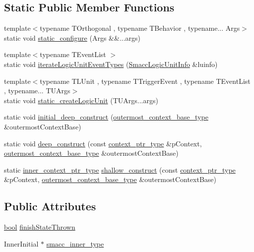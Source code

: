 \subsection*{Static Public Member Functions}
\begin{DoxyCompactItemize}
\item 
{\footnotesize template$<$typename T\+Orthogonal , typename T\+Behavior , typename... Args$>$ }\\static void \hyperlink{classsmacc_1_1SmaccState_a3e335f3290e4968db0c8e22bf88356b7}{static\+\_\+configure} (Args \&\&...args)
\item 
{\footnotesize template$<$typename T\+Event\+List $>$ }\\static void \hyperlink{classsmacc_1_1SmaccState_a234cb467d9054c636f9ee77f1174b253}{iterate\+Logic\+Unit\+Event\+Types} (\hyperlink{structsmacc_1_1SmaccLogicUnitInfo}{Smacc\+Logic\+Unit\+Info} \&luinfo)
\item 
{\footnotesize template$<$typename T\+L\+Unit , typename T\+Trigger\+Event , typename T\+Event\+List , typename... T\+U\+Args$>$ }\\static void \hyperlink{classsmacc_1_1SmaccState_a6fc90cf59c60c749e82f49aafb079b23}{static\+\_\+create\+Logic\+Unit} (T\+U\+Args...\+args)
\item 
static void \hyperlink{classsmacc_1_1SmaccState_af4b4635d16a32bdd3956e5d40ddbd01d}{initial\+\_\+deep\+\_\+construct} (\hyperlink{classsmacc_1_1SmaccState_aaf76bbe2aa9dd73e3284605f84ab4b16}{outermost\+\_\+context\+\_\+base\+\_\+type} \&outermost\+Context\+Base)
\item 
static void \hyperlink{classsmacc_1_1SmaccState_aac23d8a6909f75c5e5fca2a7c09b5368}{deep\+\_\+construct} (const \hyperlink{classsmacc_1_1SmaccState_a0e15b77514301039f6bc093a9d3f6425}{context\+\_\+ptr\+\_\+type} \&p\+Context, \hyperlink{classsmacc_1_1SmaccState_aaf76bbe2aa9dd73e3284605f84ab4b16}{outermost\+\_\+context\+\_\+base\+\_\+type} \&outermost\+Context\+Base)
\item 
static \hyperlink{classsmacc_1_1SmaccState_a65a772c2e2039e9a59148ba6ffb54d8a}{inner\+\_\+context\+\_\+ptr\+\_\+type} \hyperlink{classsmacc_1_1SmaccState_a1dccb401e1a99031863a21a590d953e6}{shallow\+\_\+construct} (const \hyperlink{classsmacc_1_1SmaccState_a0e15b77514301039f6bc093a9d3f6425}{context\+\_\+ptr\+\_\+type} \&p\+Context, \hyperlink{classsmacc_1_1SmaccState_aaf76bbe2aa9dd73e3284605f84ab4b16}{outermost\+\_\+context\+\_\+base\+\_\+type} \&outermost\+Context\+Base)
\end{DoxyCompactItemize}
\subsection*{Public Attributes}
\begin{DoxyCompactItemize}
\item 
\hyperlink{classbool}{bool} \hyperlink{classsmacc_1_1SmaccState_a6c40f733c35ddfb9ae2a2f8e9bab07d3}{finish\+State\+Thrown}
\item 
Inner\+Initial $\ast$ \hyperlink{classsmacc_1_1SmaccState_a087d0f66729b98614feb8c59ea548af1}{smacc\+\_\+inner\+\_\+type}
\end{DoxyCompactItemize}
